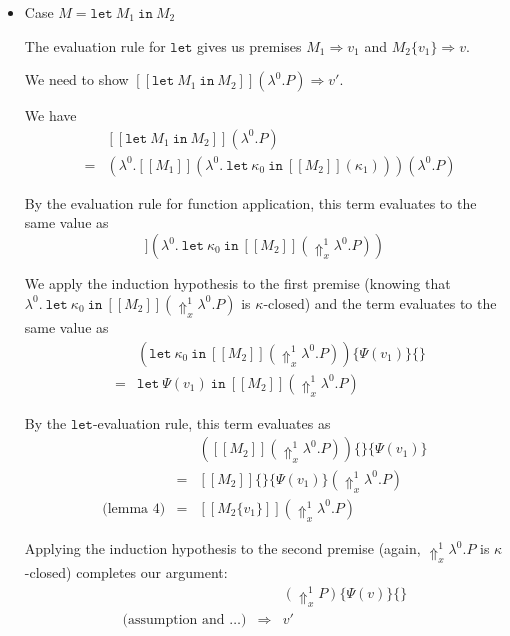 \documentclass[a4paper,11pt]{article}
\begin{document}
\begin{itemize}
\begin{itemize}
\end{itemize}

\item{Case $M = \texttt{let} \: M_{1} \: \texttt{in} \: M_{2}$}

The evaluation rule for $\texttt{let}$ gives us premises $M_{1} \Rightarrow v_{1}$ and $M_{2}\{v_{1}\} \Rightarrow v$.

We need to show
$[\![\texttt{let} \: M_{1} \: \texttt{in} \: M_{2}]\!](\lambda^{0}.P) \Rightarrow v'$.

We have
\begin{eqnarray*}
 &   & [\![\texttt{let} \: M_{1} \: \texttt{in} \: M_{2}]\!](\lambda^{0}.P) \\
 & = & (\lambda^{0}.[\![M_{1}]\!](\lambda^{0}. \: \texttt{let} \: \kappa_{0} \: \texttt{in} \: [\![M_{2}]\!](\kappa_{1})))(\lambda^{0}.P)
\end{eqnarray*}

By the evaluation rule for function application, this term evaluates to the same value as
\begin{displaymath}
[\![M_{1}]\!](\lambda^{0}. \: \texttt{let} \: \kappa_{0} \: \texttt{in} \: [\![M_{2}]\!](\Uparrow_{x}^{1} \lambda^{0}.P))
\end{displaymath}

We apply the induction hypothesis to the first premise (knowing that $\lambda^{0}. \: \texttt{let} \: \kappa_{0} \: \texttt{in} \: [\![M_{2}]\!](\Uparrow_{x}^{1} \lambda^{0}.P)$
is $\kappa$-closed) and the term evaluates to the same value as
\begin{eqnarray*}
 &   & (\texttt{let} \: \kappa_{0} \: \texttt{in} \: [\![M_{2}]\!](\Uparrow_{x}^{1} \lambda^{0}.P))\{\Psi(v_{1})\}\{\} \\
 & = & \texttt{let} \: \Psi(v_{1}) \: \texttt{in} \: [\![M_{2}]\!](\Uparrow_{x}^{1} \lambda^{0}.P)
\end{eqnarray*}

By the $\texttt{let}$-evaluation rule, this term evaluates as
\begin{eqnarray*}
                 &   & ([\![M_{2}]\!](\Uparrow_{x}^{1} \lambda^{0}.P))\{\}\{\Psi(v_{1})\} \\
                 & = & [\![M_{2}]\!]\{\}\{\Psi(v_{1})\}(\Uparrow_{x}^{1} \lambda^{0}.P) \\
\mbox{(lemma 4)} & = & [\![M_{2}\{v_{1}\}]\!](\Uparrow_{x}^{1} \lambda^{0}.P)
\end{eqnarray*}

Applying the induction hypothesis to the second premise (again, $\Uparrow_{x}^{1} \lambda^{0}.P$ is $\kappa$-closed)
completes our argument:
\begin{eqnarray*}
                               &             & (\Uparrow_{x}^{1}P)\{\Psi(v)\}\{\} \\
\mbox{(assumption and \ldots)} & \Rightarrow & v'
\end{eqnarray*}


\end{itemize}
\end{document}
